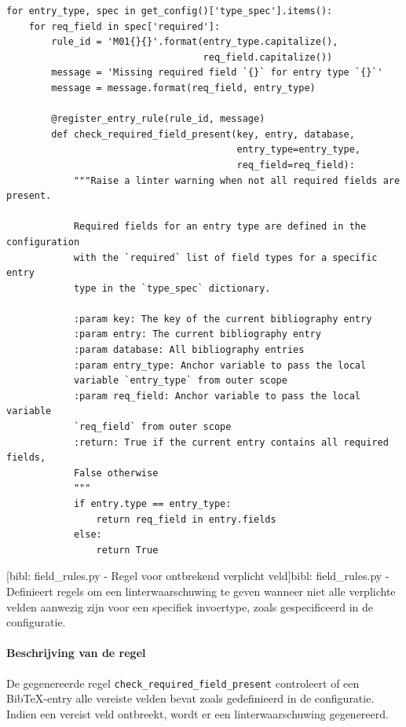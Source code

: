 \begin{verbatim}
for entry_type, spec in get_config()['type_spec'].items():
    for req_field in spec['required']:
        rule_id = 'M01{}{}'.format(entry_type.capitalize(),
                                   req_field.capitalize())
        message = 'Missing required field `{}` for entry type `{}`'
        message = message.format(req_field, entry_type)

        @register_entry_rule(rule_id, message)
        def check_required_field_present(key, entry, database,
                                         entry_type=entry_type,
                                         req_field=req_field):
            """Raise a linter warning when not all required fields are present.

            Required fields for an entry type are defined in the configuration
            with the `required` list of field types for a specific entry
            type in the `type_spec` dictionary.

            :param key: The key of the current bibliography entry
            :param entry: The current bibliography entry
            :param database: All bibliography entries
            :param entry_type: Anchor variable to pass the local
            variable `entry_type` from outer scope
            :param req_field: Anchor variable to pass the local variable
            `req_field` from outer scope
            :return: True if the current entry contains all required fields,
            False otherwise
            """
            if entry.type == entry_type:
                return req_field in entry.fields
            else:
                return True
\end{verbatim}
[bibl: field\_rules.py - Regel voor ontbrekend verplicht veld]{bibl: field\_rules.py - Definieert regels om een linterwaarschuwing te geven wanneer niet alle verplichte velden aanwezig zijn voor een specifiek invoertype, zoals gespecificeerd in de configuratie. \label{lst:bibl_field_rules_required}}

\paragraph{Beschrijving van de regel}

De gegenereerde regel \texttt{check\_required\_field\_present} controleert of een BibTeX-entry alle vereiste velden bevat zoals gedefinieerd in de configuratie. Indien een vereist veld ontbreekt, wordt er een linterwaarschuwing gegenereerd.

